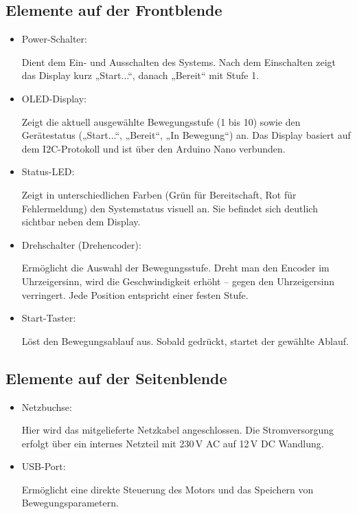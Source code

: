 \documentclass[a4paper,12pt]{report}
\begin{document}
	\subsection {Elemente auf der Frontblende }
	\begin{itemize}[leftmargin=1.5em]
		
		\item Power-Schalter: 
		
		Dient dem Ein- und Ausschalten des Systems. Nach dem Einschalten zeigt das Display kurz „Start...“, danach „Bereit“ mit Stufe 1. \\
		
		\item OLED-Display: 
		
		Zeigt die aktuell ausgewählte Bewegungsstufe (1 bis 10) sowie den Gerätestatus („Start...“, „Bereit“, „In Bewegung“) an. Das Display basiert auf dem I2C-Protokoll und ist über den Arduino Nano verbunden.\\
		
		\item Status-LED: 
		
		Zeigt in unterschiedlichen Farben (Grün für Bereitschaft, Rot für Fehlermeldung) den Systemstatus visuell an. Sie befindet sich deutlich sichtbar neben dem Display.\\ 
		
		\item Drehschalter (Drehencoder): 
		
		Ermöglicht die Auswahl der Bewegungsstufe. Dreht man den Encoder im Uhrzeigersinn, wird die Geschwindigkeit erhöht – gegen den Uhrzeigersinn verringert. Jede Position entspricht einer festen Stufe.\\
		
		\item Start-Taster: 
		
		Löst den Bewegungsablauf aus. Sobald gedrückt, startet der gewählte Ablauf.\\ 
		
	\end{itemize}
	\newpage
	
	\subsection{Elemente auf der Seitenblende}
	\begin{itemize}[leftmargin=1.5em]
		
		\item Netzbuchse: 
		
		Hier wird das mitgelieferte Netzkabel angeschlossen. Die Stromversorgung erfolgt über ein internes Netzteil mit 230 V AC auf 12 V DC Wandlung. \\
		
		\item USB-Port:
		
		Ermöglicht eine direkte Steuerung des Motors und das Speichern von Bewegungsparametern.
		
	\end{itemize}
	
\end{document}
